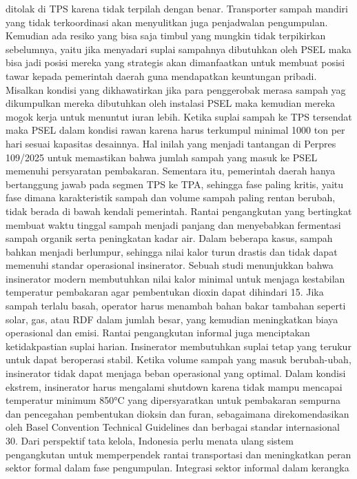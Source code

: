 \documentclass[
  letterpaper,
  DIV=11,
  numbers=noendperiod]{scrreprt}
\begin{document}
ditolak di TPS karena tidak terpilah dengan benar. Transporter sampah
mandiri yang tidak terkoordinasi akan menyulitkan juga penjadwalan
pengumpulan. Kemudian ada resiko yang bisa saja timbul yang mungkin
tidak terpikirkan sebelumnya, yaitu jika menyadari suplai sampahnya
dibutuhkan oleh PSEL maka bisa jadi posisi mereka yang strategis akan
dimanfaatkan untuk membuat posisi tawar kepada pemerintah daerah guna
mendapatkan keuntungan pribadi. Misalkan kondisi yang dikhawatirkan jika
para penggerobak merasa sampah yag dikumpulkan mereka dibutuhkan oleh
instalasi PSEL maka kemudian mereka mogok kerja untuk menuntut iuran
lebih. Ketika suplai sampah ke TPS tersendat maka PSEL dalam kondisi
rawan karena harus terkumpul minimal 1000 ton per hari sesuai kapasitas
desainnya. Hal inilah yang menjadi tantangan di Perpres 109/2025 untuk
memastikan bahwa jumlah sampah yang masuk ke PSEL memenuhi persyaratan
pembakaran. Sementara itu, pemerintah daerah hanya bertanggung jawab
pada segmen TPS ke TPA, sehingga fase paling kritis, yaitu fase dimana
karakteristik sampah dan volume sampah paling rentan berubah, tidak
berada di bawah kendali pemerintah. Rantai pengangkutan yang bertingkat
membuat waktu tinggal sampah menjadi panjang dan menyebabkan fermentasi
sampah organik serta peningkatan kadar air. Dalam beberapa kasus, sampah
bahkan menjadi berlumpur, sehingga nilai kalor turun drastis dan tidak
dapat memenuhi standar operasional insinerator. Sebuah studi menunjukkan
bahwa insinerator modern membutuhkan nilai kalor minimal untuk menjaga
kestabilan temperatur pembakaran agar pembentukan dioxin dapat dihindari
15. Jika sampah terlalu basah, operator harus menambah bahan bakar
tambahan seperti solar, gas, atau RDF dalam jumlah besar, yang kemudian
meningkatkan biaya operasional dan emisi. Rantai pengangkutan informal
juga menciptakan ketidakpastian suplai harian. Insinerator membutuhkan
suplai tetap yang terukur untuk dapat beroperasi stabil. Ketika volume
sampah yang masuk berubah-ubah, insinerator tidak dapat menjaga beban
operasional yang optimal. Dalam kondisi ekstrem, insinerator harus
mengalami shutdown karena tidak mampu mencapai temperatur minimum 850°C
yang dipersyaratkan untuk pembakaran sempurna dan pencegahan pembentukan
dioksin dan furan, sebagaimana direkomendasikan oleh Basel Convention
Technical Guidelines dan berbagai standar internasional 30. Dari
perspektif tata kelola, Indonesia perlu menata ulang sistem pengangkutan
untuk memperpendek rantai transportasi dan meningkatkan peran sektor
formal dalam fase pengumpulan. Integrasi sektor informal dalam kerangka
\end{document}

